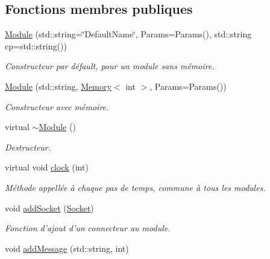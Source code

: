 \subsection*{Fonctions membres publiques}
\begin{DoxyCompactItemize}
\item 
\hypertarget{classModule_abcdd948c7444d3420f04be1bd332fbae}{\hyperlink{classModule_abcdd948c7444d3420f04be1bd332fbae}{Module} (std\-::string=\char`\"{}Default\-Name\char`\"{}, Params=Params(), std\-::string cp=std\-::string())}\label{classModule_abcdd948c7444d3420f04be1bd332fbae}

\begin{DoxyCompactList}\small\item\em Constructeur par défault, pour un module sans mémoire. \end{DoxyCompactList}\item 
\hypertarget{classModule_ae2ce24f11deec1453dfaba1f21a36f2c}{\hyperlink{classModule_ae2ce24f11deec1453dfaba1f21a36f2c}{Module} (std\-::string, \hyperlink{classMemory}{Memory}$<$ int $>$, Params=Params())}\label{classModule_ae2ce24f11deec1453dfaba1f21a36f2c}

\begin{DoxyCompactList}\small\item\em Constructeur avec mémoire. \end{DoxyCompactList}\item 
\hypertarget{classModule_a7c9d9c096786d127590fdd8aa2b7d681}{virtual \hyperlink{classModule_a7c9d9c096786d127590fdd8aa2b7d681}{$\sim$\-Module} ()}\label{classModule_a7c9d9c096786d127590fdd8aa2b7d681}

\begin{DoxyCompactList}\small\item\em Destructeur. \end{DoxyCompactList}\item 
virtual void \hyperlink{classModule_ab7ea9648fa500696c85e93ebd0666390}{clock} (int)
\begin{DoxyCompactList}\small\item\em Méthode appellée à chaque pas de temps, commune à tous les modules. \end{DoxyCompactList}\item 
\hypertarget{classModule_aeb7302c667eb923a4dc25ae235c744dc}{void \hyperlink{classModule_aeb7302c667eb923a4dc25ae235c744dc}{add\-Socket} (\hyperlink{classSocket}{Socket})}\label{classModule_aeb7302c667eb923a4dc25ae235c744dc}

\begin{DoxyCompactList}\small\item\em Fonction d'ajout d'un connecteur au module. \end{DoxyCompactList}\item 
\hypertarget{classModule_a146f454fded03cda14359e419086afa5}{void \hyperlink{classModule_a146f454fded03cda14359e419086afa5}{add\-Message} (std\-::string, int)}\label{classModule_a146f454fded03cda14359e419086afa5}


\end{DoxyCompactItemize}
